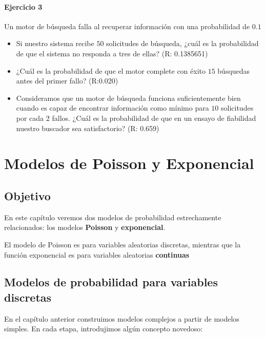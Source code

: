 \documentclass[
]{book}
\begin{document}
\hypertarget{ejercicio-3-4}{%
\subsubsection{Ejercicio 3}\label{ejercicio-3-4}}

Un motor de búsqueda falla al recuperar información con una probabilidad de \(0.1\)

\begin{itemize}
\item
  Si nuestro sistema recibe \(50\) solicitudes de búsqueda, ¿cuál es la probabilidad de que el sistema no responda a tres de ellas? (R: 0.1385651)
\item
  ¿Cuál es la probabilidad de que el motor complete con éxito \(15\) búsquedas antes del primer fallo? (R:0.020)
\item
  Consideramos que un motor de búsqueda funciona suficientemente bien cuando es capaz de encontrar información como mínimo para \(10\) solicitudes por cada \(2\) fallos. ¿Cuál es la probabilidad de que en un ensayo de fiabilidad nuestro buscador sea satisfactorio? (R: 0.659)
\end{itemize}

\hypertarget{modelos-de-poisson-y-exponencial}{%
\chapter{Modelos de Poisson y Exponencial}\label{modelos-de-poisson-y-exponencial}}

\hypertarget{objetivo-4}{%
\section{Objetivo}\label{objetivo-4}}

En este capítulo veremos dos modelos de probabilidad estrechamente relacionados: los modelos \textbf{Poisson} y \textbf{exponencial}.

El modelo de Poisson es para variables aleatorias discretas, mientras que la función exponencial es para variables aleatorias \textbf{continuas}

\hypertarget{modelos-de-probabilidad-para-variables-discretas}{%
\section{Modelos de probabilidad para variables discretas}\label{modelos-de-probabilidad-para-variables-discretas}}

En el capítulo anterior construimos modelos complejos a partir de modelos simples. En cada etapa, introdujimos algún concepto novedoso:
\end{document}
